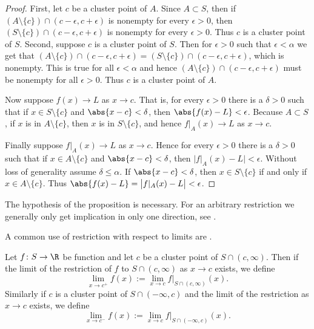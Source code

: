 \documentclass[12pt]{book}
\begin{document}
\begin{proof}
First, let $c$ be a cluster point of $A$.
Since $A \subset S$, then if $( A \setminus \{ c\} ) \cap
(c-\epsilon,c+\epsilon)$ is nonempty for every $\epsilon > 0$,
then $( S \setminus \{ c\} ) \cap
(c-\epsilon,c+\epsilon)$ is nonempty for every $\epsilon > 0$.
Thus $c$ is a cluster point of $S$.
Second, suppose $c$ is a cluster
point of $S$.
Then for $\epsilon > 0$ such that $\epsilon < \alpha$
we get that $( A \setminus \{ c\} ) \cap (c-\epsilon,c+\epsilon) =
( S \setminus \{ c\} ) \cap (c-\epsilon,c+\epsilon)$, which is nonempty.
This is true for all
$\epsilon < \alpha$ and hence 
$( A \setminus \{ c\} ) \cap (c-\epsilon,c+\epsilon)$ must be nonempty for all
$\epsilon > 0$.
Thus $c$ is a cluster point of $A$.

Now suppose $f(x) \to L$ as $x \to c$.
That is, for every $\epsilon > 0$
there is a $\delta > 0$ such that if $x \in S \setminus \{ c \}$
and $\abs{x-c} < \delta$, then $\abs{f(x)-L} < \epsilon$.
Because $A \subset S$,
if $x$ is in $A \setminus \{ c \}$, then $x$ is in $S \setminus \{ c
\}$, and hence $f|_A(x) \to L$ as $x \to c$.

Finally suppose $f|_A(x) \to L$ as $x \to c$.
Hence for every $\epsilon > 0$
there is a $\delta > 0$ such that if $x \in A \setminus \{ c \}$
and $\abs{x-c} < \delta$, then $\bigl\lvert f|_A(x)-L \bigr\rvert < \epsilon$.
Without loss of generality assume $\delta \leq \alpha$.
If
$\abs{x-c} < \delta$, then $x \in S \setminus \{c \}$ if and only if
$x \in A \setminus \{c \}$.
Thus $\abs{f(x)-L} = \bigl\lvert f|_A(x)-L
\bigr\rvert < \epsilon$.
\end{proof}

The hypothesis of the proposition is necessary.
For an arbitrary
restriction we generally only get implication in only one direction,
see .

A common use of restriction with respect to limits
are \emph{}.

\begin{defn} \label{defn:onesidedlimits}
Let $f \colon S \to \R$ be function and let $c$ be a cluster point of
$S \cap (c,\infty)$.
Then if the limit
of the restriction of $f$ to $S \cap (c,\infty)$ 
 as $x \to c$ exists, we define
\begin{equation*}
\lim_{x \to c^+} f(x) := \lim_{x\to c} f|_{S \cap (c,\infty)}(x) .
\end{equation*}
Similarly if $c$ is a cluster point of 
$S \cap (-\infty,c)$ and the limit of the restriction as $x \to c$
exists, we define
\begin{equation*}
\lim_{x \to c^-} f(x) := \lim_{x\to c} f|_{S \cap (-\infty,c)}(x) .
\end{equation*}
\end{defn}
\end{document}

